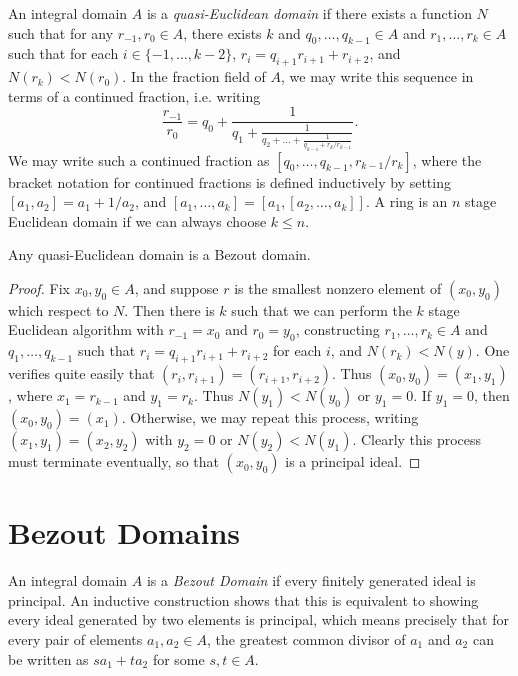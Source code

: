 An integral domain $A$ is a \emph{quasi-Euclidean domain} if there exists a function $N$ such that for any $r_{-1},r_0 \in A$, there exists $k$ and $q_0, \dots, q_{k-1} \in A$ and $r_1, \dots, r_k \in A$ such that for each $i \in \{ -1, \dots, k-2 \}$, $r_i = q_{i+1}r_{i+1} + r_{i+2}$, and $N(r_k) < N(r_0)$. In the fraction field of $A$, we may write this sequence in terms of a continued fraction, i.e. writing
%
\[ \frac{r_{-1}}{r_0} = q_0 + \frac{1}{q_1 + \frac{1}{q_2 + \dots + \frac{1}{q_{k-1} + r_k/r_{k-1}}}}. \]
%
We may write such a continued fraction as $[q_0,\dots,q_{k-1},r_{k-1}/r_k]$, where the bracket notation for continued fractions is defined inductively by setting $[a_1,a_2] = a_1 + 1/a_2$, and $[a_1,\dots,a_k] = [a_1,[a_2,\dots,a_k]]$. A ring is an $n$ stage Euclidean domain if we can always choose $k \leq n$.

\begin{lemma}
    Any quasi-Euclidean domain is a Bezout domain.
\end{lemma}
\begin{proof}
    Fix $x_0,y_0 \in A$, and suppose $r$ is the smallest nonzero element of $(x_0,y_0)$ which respect to $N$. Then there is $k$ such that we can perform the $k$ stage Euclidean algorithm with $r_{-1} = x_0$ and $r_0 = y_0$, constructing $r_1, \dots, r_k \in A$ and $q_1, \dots, q_{k-1}$ such that $r_i = q_{i+1}r_{i+1} + r_{i+2}$ for each $i$, and $N(r_k) < N(y)$. One verifies quite easily that $(r_i,r_{i+1}) = (r_{i+1},r_{i+2})$. Thus $(x_0,y_0) = (x_1,y_1)$, where $x_1 = r_{k-1}$ and $y_1 = r_k$. Thus $N(y_1) < N(y_0)$ or $y_1 = 0$. If $y_1 = 0$, then $(x_0,y_0) = (x_1)$. Otherwise, we may repeat this process, writing $(x_1,y_1) = (x_2,y_2)$ with $y_2 = 0$ or $N(y_2) < N(y_1)$. Clearly this process must terminate eventually, so that $(x_0,y_0)$ is a principal ideal.
\end{proof}




\section{Bezout Domains}

An integral domain $A$ is a \emph{Bezout Domain} if every finitely generated ideal is principal. An inductive construction shows that this is equivalent to showing every ideal generated by two elements is principal, which means precisely that for every pair of elements $a_1,a_2 \in A$, the greatest common divisor of $a_1$ and $a_2$ can be written as $sa_1 + ta_2$ for some $s,t \in A$.

